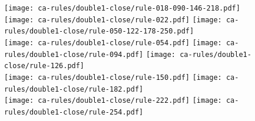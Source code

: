 \begin{figure}[h]
    \texttt{[image: ca-rules/double1-close/rule-018-090-146-218.pdf]}%
    \hspace{0.01\textwidth}%
    \texttt{[image: ca-rules/double1-close/rule-022.pdf]}%
    \hspace{0.01\textwidth}%
    \texttt{[image: ca-rules/double1-close/rule-050-122-178-250.pdf]}\\%
    \vspace{0.01\textwidth}%
    \texttt{[image: ca-rules/double1-close/rule-054.pdf]}%
    \hspace{0.01\textwidth}%
    \texttt{[image: ca-rules/double1-close/rule-094.pdf]}%
    \hspace{0.01\textwidth}%
    \texttt{[image: ca-rules/double1-close/rule-126.pdf]}\\%
    \vspace{0.01\textwidth}%
    \texttt{[image: ca-rules/double1-close/rule-150.pdf]}%
    \hspace{0.01\textwidth}%
    \texttt{[image: ca-rules/double1-close/rule-182.pdf]}\\%
    \vspace{0.01\textwidth}%
    \texttt{[image: ca-rules/double1-close/rule-222.pdf]}%
    \hspace{0.01\textwidth}%
    \texttt{[image: ca-rules/double1-close/rule-254.pdf]}%
    \hspace{0.01\textwidth}%
    \caption{}
    \label{fig:supplement:ca-rules-double-close}
\end{figure}
